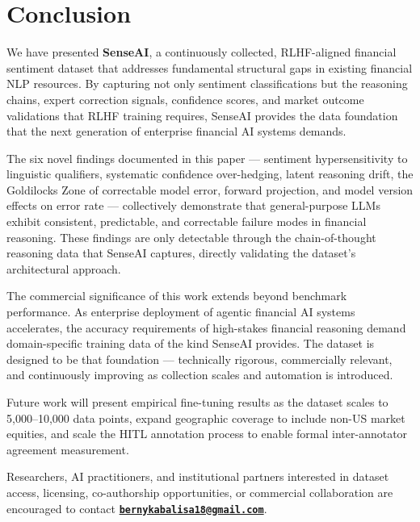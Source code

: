 \documentclass[11pt,a4paper]{article}
\begin{document}
\section{Conclusion}
\label{sec:conclusion}

We have presented \textbf{SenseAI}, a continuously collected, RLHF-aligned financial
sentiment dataset that addresses fundamental structural gaps in existing financial
NLP resources. By capturing not only sentiment classifications but the reasoning
chains, expert correction signals, confidence scores, and market outcome validations
that RLHF training requires, SenseAI provides the data foundation that the next
generation of enterprise financial AI systems demands.

The six novel findings documented in this paper --- sentiment hypersensitivity to
linguistic qualifiers, systematic confidence over-hedging, latent reasoning drift, the
Goldilocks Zone of correctable model error, forward projection, and model version
effects on error rate --- collectively demonstrate that general-purpose LLMs exhibit
consistent, predictable, and correctable failure modes in financial reasoning. These
findings are only detectable through the chain-of-thought reasoning data that SenseAI
captures, directly validating the dataset's architectural approach.

The commercial significance of this work extends beyond benchmark performance.
As enterprise deployment of agentic financial AI systems accelerates, the accuracy
requirements of high-stakes financial reasoning demand domain-specific training data
of the kind SenseAI provides. The dataset is designed to be that foundation ---
technically rigorous, commercially relevant, and continuously improving as collection
scales and automation is introduced.

Future work will present empirical fine-tuning results as the dataset scales to
5,000--10,000 data points, expand geographic coverage to include non-US market
equities, and scale the HITL annotation process to enable formal inter-annotator
agreement measurement.

\medskip
\noindent Researchers, AI practitioners, and institutional partners interested in dataset
access, licensing, co-authorship opportunities, or commercial collaboration are
encouraged to contact
\href{mailto:bernykabalisa18@gmail.com}{\textbf{\texttt{bernykabalisa18@gmail.com}}}.
\end{document}
